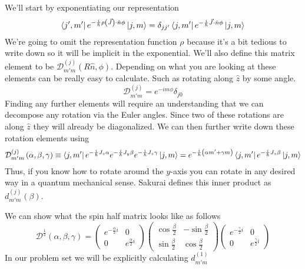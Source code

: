 We'll start by exponentiating our representation
\begin{align*}
    \Bra{j',m'} e^{-\frac{i}{\hbar} \rho \left(\vec{J}\right) \cdot \hat{n} \phi}
        \Ket{j,m} = \delta_{jj'} 
        \Bra{j,m'} e^{-\frac{i}{\hbar} \vec{J} \cdot \hat{n} \phi} \Ket{j,m}
\end{align*}
We're going to omit the representation function $\rho$ because it's a bit
tedious to write down so it will be implicit in the exponential. We'll
also define this matrix element to be
$\mathcal{D}_{m'm}^{(j)} \left(R \hat{n}, \phi\right)$. Depending
on what you are looking at these elements can be really easy to calculate. Such as
rotating along $\hat{z}$ by some angle.
$$
    \mathcal{D}_{m'm}^{(j)} = e^{-im \phi} \delta_{j 0}
$$
Finding any further elements will require an understanding that we can decompose
any rotation via the Euler angles. Since two of these rotations are along $\hat{z}$
they will already be diagonalized. We can then further write down these rotation elements using
\begin{align*}
    \mathcal{D}_{m'm}^{(j)} \left(\alpha, \beta, \gamma\right) \equiv
        \Bra{j,m'} e^{-\frac{i}{\hbar} J_z \alpha}
        e^{-\frac{i}{\hbar} J_y \beta} 
        e^{-\frac{i}{\hbar} J_z \gamma} \Ket{j,m} =
    e^{-\frac{i}{\hbar} \left(\alpha m' + \gamma m\right)}
        \Bra{j,m'} e^{-\frac{i}{\hbar} J_z \beta} \Ket{j,m}
\end{align*}
Thus, if you know how to rotate around the $y$-axis you can rotate in any desired way
in a quantum mechanical sense. Sakurai defines this inner product as $d^{(j)}_{m'm}(\beta)$.

We can show what the spin half matrix looks like as follows
$$
    \mathcal{D}^{\frac{1}{2}}(\alpha, \beta, \gamma) =
        \begin{pmatrix}
            e^{-\frac{\alpha}{2}i} & 0 \\
            0 & e^{\frac{\alpha}{2}i}
        \end{pmatrix}
        \begin{pmatrix}
            \cos \frac{\beta}{2} & -\sin \frac{\beta}{2} \\
            \sin \frac{\beta}{2} & \cos \frac{\beta}{2}
        \end{pmatrix}
        \begin{pmatrix}
            e^{- \frac{\gamma}{2} i} & 0 \\
            0 & e^{\frac{\gamma}{2}i}
        \end{pmatrix}
$$
In our problem set we will be explicitly calculating $d^{(1)}_{m'm}$

